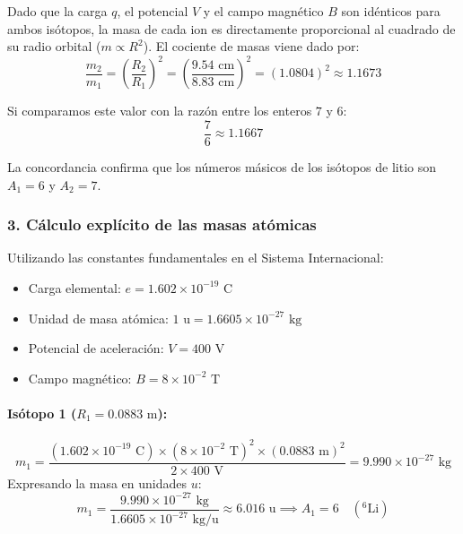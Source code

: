 \begin{problema}
Dado que la carga $q$, el potencial $V$ y el campo magnético $B$ son idénticos para ambos isótopos, la masa de cada ion es directamente proporcional al cuadrado de su radio orbital ($m \propto R^2$). El cociente de masas viene dado por:
\begin{equation}
\frac{m_2}{m_1} = \left( \frac{R_2}{R_1} \right)^2 = \left( \frac{9.54\text{ cm}}{8.83\text{ cm}} \right)^2 = (1.0804)^2 \approx 1.1673
\end{equation}

Si comparamos este valor con la razón entre los enteros $7$ y $6$:
\begin{equation}
\frac{7}{6} \approx 1.1667
\end{equation}

La concordancia confirma que los números másicos de los isótopos de litio son $A_1 = 6$ y $A_2 = 7$.

\subsubsection*{3. Cálculo explícito de las masas atómicas}

Utilizando las constantes fundamentales en el Sistema Internacional:
\begin{itemize}
    \item Carga elemental: $e = 1.602 \times 10^{-19}\text{ C}$
    \item Unidad de masa atómica: $1\text{ u} = 1.6605 \times 10^{-27}\text{ kg}$
    \item Potencial de aceleración: $V = 400\text{ V}$
    \item Campo magnético: $B = 8 \times 10^{-2}\text{ T}$
\end{itemize}

\paragraph{Isótopo 1 ($R_1 = 0.0883\text{ m}$):}
\begin{equation}
m_1 = \frac{(1.602 \times 10^{-19}\text{ C}) \times (8 \times 10^{-2}\text{ T})^2 \times (0.0883\text{ m})^2}{2 \times 400\text{ V}} = 9.990 \times 10^{-27}\text{ kg}
\end{equation}
Expresando la masa en unidades $u$:
\begin{equation}
m_1 = \frac{9.990 \times 10^{-27}\text{ kg}}{1.6605 \times 10^{-27}\text{ kg/u}} \approx 6.016\text{ u} \implies A_1 = 6 \quad ({}^{6}\text{Li})
\end{equation}


\end{problema}
